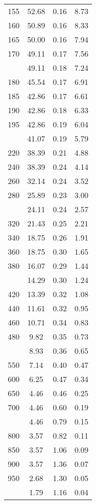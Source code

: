 \begin{table}[ht]
\begin{tabular}{lccc}
  155 & 52.68 & 0.16 & 8.73 \\ 
  160 & 50.89 & 0.16 & 8.33 \\ 
  165 & 50.00 & 0.16 & 7.94 \\ 
  170 & 49.11 & 0.17 & 7.56 \\ 
   \addlinespace
175 & 49.11 & 0.18 & 7.24 \\ 
  180 & 45.54 & 0.17 & 6.91 \\ 
  185 & 42.86 & 0.17 & 6.61 \\ 
  190 & 42.86 & 0.18 & 6.33 \\ 
  195 & 42.86 & 0.19 & 6.04 \\ 
   \addlinespace
200 & 41.07 & 0.19 & 5.79 \\ 
  220 & 38.39 & 0.21 & 4.88 \\ 
  240 & 38.39 & 0.24 & 4.14 \\ 
  260 & 32.14 & 0.24 & 3.52 \\ 
  280 & 25.89 & 0.23 & 3.00 \\ 
   \addlinespace
300 & 24.11 & 0.24 & 2.57 \\ 
  320 & 21.43 & 0.25 & 2.21 \\ 
  340 & 18.75 & 0.26 & 1.91 \\ 
  360 & 18.75 & 0.30 & 1.65 \\ 
  380 & 16.07 & 0.29 & 1.44 \\ 
   \addlinespace
400 & 14.29 & 0.30 & 1.24 \\ 
  420 & 13.39 & 0.32 & 1.08 \\ 
  440 & 11.61 & 0.32 & 0.95 \\ 
  460 & 10.71 & 0.34 & 0.83 \\ 
  480 & 9.82 & 0.35 & 0.73 \\ 
   \addlinespace
500 & 8.93 & 0.36 & 0.65 \\ 
  550 & 7.14 & 0.40 & 0.47 \\ 
  600 & 6.25 & 0.47 & 0.34 \\ 
  650 & 4.46 & 0.46 & 0.25 \\ 
  700 & 4.46 & 0.60 & 0.19 \\ 
   \addlinespace
750 & 4.46 & 0.79 & 0.15 \\ 
  800 & 3.57 & 0.82 & 0.11 \\ 
  850 & 3.57 & 1.06 & 0.09 \\ 
  900 & 3.57 & 1.36 & 0.07 \\ 
  950 & 2.68 & 1.30 & 0.05 \\ 
   \addlinespace
1000 & 1.79 & 1.16 & 0.04 \\ 
   \bottomrule
\end{tabular}
\end{table}
